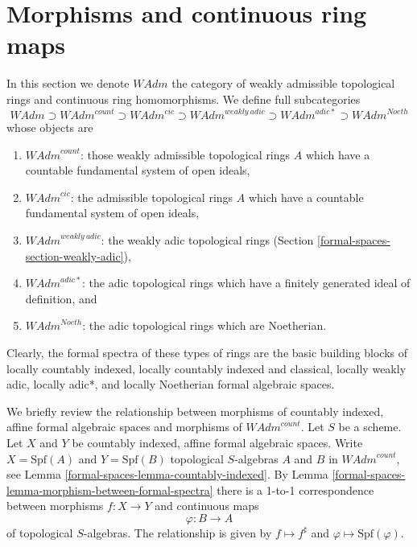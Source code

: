 \section{Morphisms and continuous ring maps}
\label{formal-spaces-section-morphisms-rings}
In this section we denote $\textit{WAdm}$ the category of
weakly admissible topological rings and continuous ring homomorphisms.
We define full subcategories
$$
\textit{WAdm} \supset
\textit{WAdm}^{count} \supset
\textit{WAdm}^{cic} \supset
\textit{WAdm}^{weakly\ adic} \supset
\textit{WAdm}^{adic*} \supset
\textit{WAdm}^{Noeth}
$$
whose objects are
\begin{enumerate}
\item $\textit{WAdm}^{count}$: those weakly admissible topological rings
$A$ which have a countable fundamental system of open ideals,
\item $\textit{WAdm}^{cic}$: the admissible topological rings
$A$ which have a countable fundamental system of open ideals,
\item $\textit{WAdm}^{weakly\ adic}$: the weakly adic topological rings
(Section \ref{formal-spaces-section-weakly-adic}),
\item $\textit{WAdm}^{adic*}$: the adic topological rings which have
a finitely generated ideal of definition, and
\item $\textit{WAdm}^{Noeth}$: the adic topological rings which
are Noetherian.
\end{enumerate}
Clearly, the formal spectra of these types of rings are the basic
building blocks of
locally countably indexed,
locally countably indexed and classical,
locally weakly adic,
locally adic*, and
locally Noetherian formal algebraic spaces.

\medskip\noindent
We briefly review the relationship between morphisms of
countably indexed, affine formal algebraic spaces and
morphisms of $\textit{WAdm}^{count}$.
Let $S$ be a scheme. Let $X$ and $Y$ be countably indexed,
affine formal algebraic spaces. Write $X = \text{Spf}(A)$
and $Y = \text{Spf}(B)$ topological $S$-algebras
$A$ and $B$ in $\textit{WAdm}^{count}$, see
Lemma \ref{formal-spaces-lemma-countably-indexed}.
By Lemma \ref{formal-spaces-lemma-morphism-between-formal-spectra}
there is a 1-to-1 correspondence between morphisms
$f : X \to Y$ and continuous maps
$$
\varphi : B \longrightarrow A
$$
of topological $S$-algebras. The relationship is given by
$f \mapsto f^\sharp$ and $\varphi \mapsto \text{Spf}(\varphi)$.

